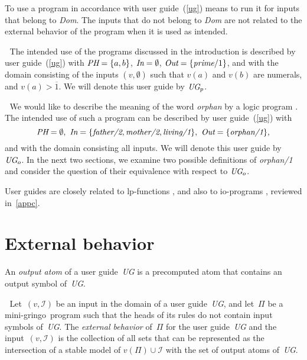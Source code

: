 \documentclass{new_tlp}
\def\gringo{{\sc gringo}}
\def\num{\overline}
\newcommand{\I}{\mathcal{I}}
\begin{document}
To use a program in accordance with user guide~(\ref{ug})
means to run it for inputs that belong to \emph{Dom}.  The
inputs that do not belong to \emph{Dom} are not related to the
external behavior of the program when it is used as intended.

\medskip{}$\;$ The intended use of the
programs discussed in the introduction is
described by user guide~(\ref{ug}) with
$\emph{PH} = \{a,b\}$, $\emph{In} = \emptyset$,
$\emph{Out} = \{\emph{prime}/1\}$,
and with the domain consisting of the inputs $(v,\emptyset)$ such that
$v(a)$ and $v(b)$ are numerals, and $v(a)>\num 1$.  We will denote this
user guide by $\emph{UG}_p$.

\medskip{}$\;$ We would like to describe the meaning
of the word \emph{orphan} by a logic program \cite[Section~4.1.2]{gel14}.
The intended use of such a
program can be described by user guide~(\ref{ug}) with
$$\emph{PH} = \emptyset,\
\emph{In} = \{\emph{father/2},\emph{mother/2}, \emph{living/1}\},\
\emph{Out} = \{\emph{orphan/1}\},$$
and with the domain consisting all inputs.    We will denote this
user guide by~$\emph{UG}_o$.  In the next two sections, we examine
two possible definitions of \hbox{\emph{orphan/1}}
and consider the question of their
equivalence with respect to $\emph{UG}_o$.
\medskip

User guides are closely related to lp-functions \cite[Section~2]{gel02},
and also to \hbox{io-programs} \cite[Section~5]{fan20}, reviewed
in~\ref{appc}.

\section{External behavior}

    An \emph{output atom} of a user guide~\emph{UG} is a precomputed atom
    that contains an output symbol of~\emph{UG}.
    
    \medskip{}$\;$
    Let~$(v,\I)$ be an input in the domain
    of a user guide~\emph{UG}, and let~$\Pi$ be
a mini-\gringo\ program such that the heads of its rules do not
contain input symbols of~\emph{UG}.  The \emph{external behavior} of~$\Pi$
for the user guide~\emph{UG} and the input~$(v,\I)$ is the collection
of all sets that can be represented as the intersection of a stable model
of $v(\Pi)\cup\I$ with the set of output atoms of~\emph{UG}.
\end{document}
